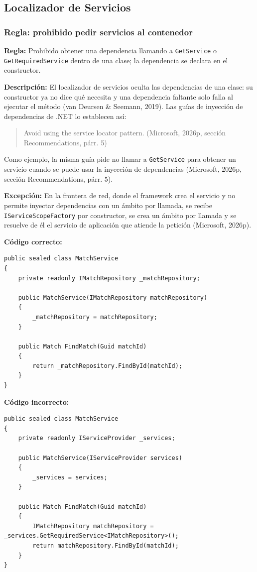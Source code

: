 \subsection{Localizador de Servicios}

\subsubsection{Regla: prohibido pedir servicios al contenedor}

\textbf{Regla:} Prohibido obtener una dependencia llamando a \texttt{GetService} o \texttt{GetRequiredService} dentro de una clase; la dependencia se declara en el constructor.

\textbf{Descripción:} El localizador de servicios oculta las dependencias de una clase: su constructor ya no dice qué necesita y una dependencia faltante solo falla al ejecutar el método (van Deursen \& Seemann, 2019). Las guías de inyección de dependencias de .NET lo establecen así:
\begin{quote}
Avoid using the service locator pattern. (Microsoft, 2026p, sección Recommendations, párr. 5)
\end{quote}
\noindent Como ejemplo, la misma guía pide no llamar a \texttt{GetService} para obtener un servicio cuando se puede usar la inyección de dependencias (Microsoft, 2026p, sección Recommendations, párr. 5).

\textbf{Excepción:} En la frontera de red, donde el framework crea el servicio y no permite inyectar dependencias con un ámbito por llamada, se recibe \texttt{IServiceScopeFactory} por constructor, se crea un ámbito por llamada y se resuelve de él el servicio de aplicación que atiende la petición (Microsoft, 2026p).

\textbf{Código correcto:}
\begin{lstlisting}[style=csharpstyle]
public sealed class MatchService
{
    private readonly IMatchRepository _matchRepository;

    public MatchService(IMatchRepository matchRepository)
    {
        _matchRepository = matchRepository;
    }

    public Match FindMatch(Guid matchId)
    {
        return _matchRepository.FindById(matchId);
    }
}
\end{lstlisting}

\textbf{Código incorrecto:}
\begin{lstlisting}[style=csharpstyle]
public sealed class MatchService
{
    private readonly IServiceProvider _services;

    public MatchService(IServiceProvider services)
    {
        _services = services;
    }

    public Match FindMatch(Guid matchId)
    {
        IMatchRepository matchRepository = _services.GetRequiredService<IMatchRepository>();
        return matchRepository.FindById(matchId);
    }
}
\end{lstlisting}
